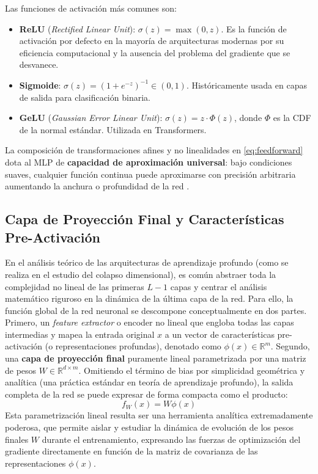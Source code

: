 Las funciones de activación más comunes son:
\begin{itemize}
    \item \textbf{ReLU} (\textit{Rectified Linear Unit}): $\sigma(z) = \max(0, z)$. Es la función de activación por defecto en la mayoría de arquitecturas modernas por su eficiencia computacional y la ausencia del problema del gradiente que se desvanece.
    \item \textbf{Sigmoide}: $\sigma(z) = (1 + e^{-z})^{-1} \in (0,1)$. Históricamente usada en capas de salida para clasificación binaria.
    \item \textbf{GeLU} (\textit{Gaussian Error Linear Unit}): $\sigma(z) = z \cdot \Phi(z)$, donde $\Phi$ es la CDF de la normal estándar. Utilizada en Transformers.
\end{itemize}

La composición de transformaciones afines y no linealidades en \eqref{eq:feedforward} dota al MLP de \textbf{capacidad de aproximación universal}: bajo condiciones suaves, cualquier función continua puede aproximarse con precisión arbitraria aumentando la anchura o profundidad de la red \cite{goodfellow2016deep}.

\subsection{Capa de Proyección Final y Características Pre-Activación}
\label{subsec:capa_proyeccion}

En el análisis teórico de las arquitecturas de aprendizaje profundo (como se realiza en el estudio del colapso dimensional), es común abstraer toda la complejidad no lineal de las primeras $L-1$ capas y centrar el análisis matemático riguroso en la dinámica de la última capa de la red. Para ello, la función global de la red neuronal se descompone conceptualmente en dos partes. Primero, un \textit{feature extractor} o encoder no lineal que engloba todas las capas intermedias y mapea la entrada original $x$ a un vector de características pre-activación (o representaciones profundas), denotado como $\phi(x) \in \mathbb{R}^m$. Segundo, una \textbf{capa de proyección final} puramente lineal parametrizada por una matriz de pesos $W \in \mathbb{R}^{d \times m}$. Omitiendo el término de bias por simplicidad geométrica y analítica (una práctica estándar en teoría de aprendizaje profundo), la salida completa de la red se puede expresar de forma compacta como el producto:
\begin{equation}
    f_W(x) = W \phi(x)
\end{equation}
Esta parametrización lineal resulta ser una herramienta analítica extremadamente poderosa, que permite aislar y estudiar la dinámica de evolución de los pesos finales $W$ durante el entrenamiento, expresando las fuerzas de optimización del gradiente directamente en función de la matriz de covarianza de las representaciones $\phi(x)$.

